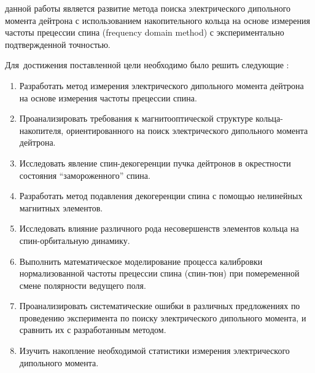 

{\aim} данной работы является развитие метода поиска электрического дипольного момента дейтрона с использованием накопительного кольца на основе измерения частоты прецессии спина (frequency domain method) с экспериментально подтвержденной точностью.

Для~достижения поставленной цели необходимо было решить следующие {\tasks}:
\begin{enumerate}
	\item Разработать метод измерения электрического дипольного момента дейтрона на основе измерения частоты прецессии спина.
	\item Проанализировать требования к магнитооптической структуре кольца-накопителя, ориентированного на поиск электрического дипольного момента дейтрона.
	\item Исследовать явление спин-декогеренции пучка дейтронов в окрестности состояния ``замороженного'' спина. 
	\item Разработать метод подавления декогеренции спина с помощью нелинейных магнитных элементов.
	\item Исследовать влияние различного рода несовершенств элементов кольца на спин-орбитальную динамику. 
	\item Выполнить математическое моделирование процесса калибровки нормализованной частоты прецессии спина (спин-тюн) при помеременной смене полярности ведущего поля.
	\item Проанализировать систематические ошибки в различных предложениях по проведению эксперимента по поиску электрического дипольного момента, и сравнить их с разработанным методом. 
	\item Изучить накопление необходимой статистики измерения электрического дипольного момента.
\end{enumerate}

